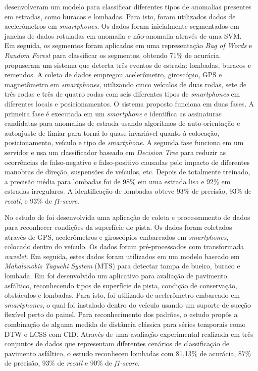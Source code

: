\cite{Aragon2016} desenvolveram um modelo para classificar diferentes tipos de anomalias presentes em estradas, como buracos e lombadas. Para isto, foram utilizados dados de acelerômetros em \textit{smartphones}. Os dados foram inicialmente segmentados em janelas de dados rotuladas em anomalia e não-anomalia através de uma SVM. Em seguida, os segmentos foram aplicados em uma representação \textit{Bag of Words} e \textit{Random Forest} para classificar os segmentos, obtendo 71\% de acurácia. \cite{Alam2020} propuseram um sistema que detecta três eventos de estrada: lombadas, buracos e remendos. A coleta de dados empregou acelerômetro, giroscópio, GPS e magnetômetro em \textit{smartphones}, utilizando cinco veículos de duas rodas, sete de três rodas e três de quatro rodas com seis diferentes tipos de \textit{smartphones} em diferentes locais e posicionamentos. O sistema proposto funciona em duas fases. A primeira fase é executada em um \textit{smartphone} e identifica as assinaturas candidatas para anomalias de estrada usando algoritmos de auto-orientação e autoajuste de limiar para torná-lo quase invariável quanto à colocação, posicionamento, veículo e tipo de \textit{smartphone}. A segunda fase funciona em um servidor e usa um classificador baseado em \textit{Decision Tree} para reduzir as ocorrências de falso-negativo e falso-positivo causadas pelo impacto de diferentes manobras de direção, suspensões de veículos, etc. Depois de totalmente treinado, a precisão média para lombadas foi de 98\% em uma estrada lisa e 92\% em estradas irregulares. A identificação de lombadas obteve 93\% de precisão, 93\% de \textit{recall}, e 93\% de \textit{f1-score}.

No estudo de \cite{Wang2018} foi desenvolvida uma aplicação de coleta e processamento de dados para reconhecer condições da superfície de pista. Os dados foram coletados através de GPS, acelerômetros e giroscópios embarcados em \textit{smartphones}, colocado dentro do veículo. Os dados foram pré-processados com transformada \textit{wavelet}. Em seguida, estes dados foram utilizados em um modelo baseado em \textit{Mahalanobis Taguchi System} (MTS) para detectar tampa de bueiro, buraco e lombada. Em \cite{Souza2018} foi desenvolvido um aplicativo para avaliação de pavimento asfáltico, reconhecendo tipos de superfície de pista, condição de conservação, obstáculos e lombadas. Para isto, foi utilizado de acelerômetro embarcado em \textit{smartphones}, o qual foi instalado dentro do veículo usando um suporte de sucção flexível perto do painel. Para reconhecimento dos padrões, o estudo propôs a combinação de alguma medida de distância clássica para séries temporais como DTW e LCSS com CID. Através de uma avaliação experimental realizada em três conjuntos de dados que representam diferentes cenários de classificação de pavimento asfáltico, o estudo reconheceu lombadas com 81,13\% de acurácia, 87\% de precisão, 93\% de \textit{recall} e 90\% de \textit{f1-score}.

